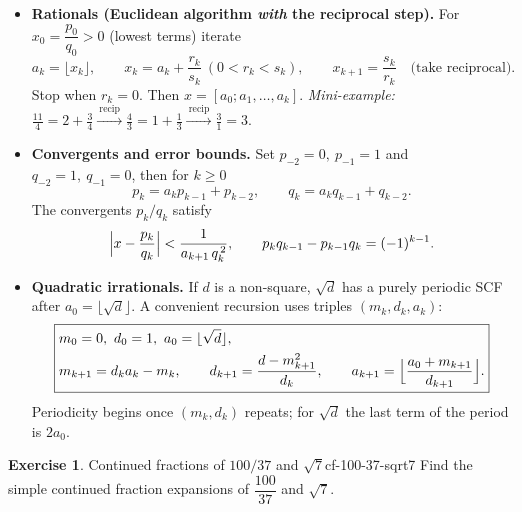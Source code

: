 \documentclass[11pt,a4paper]{article}
\theoremstyle{definition}
\newtheorem{exercise}{Exercise} %
\theoremstyle{definition}
\theoremstyle{plain}
\theoremstyle{remark}
\begin{document}
\begin{itemize}
	\item \textbf{Rationals (Euclidean algorithm \emph{with} the reciprocal step).}
	For $x_0=\dfrac{p_0}{q_0}>0$ (lowest terms) iterate
	\[
	a_k=\bigl\lfloor x_k\bigr\rfloor,\qquad
	x_k=a_k+\frac{r_k}{s_k}\ (0<r_k<s_k),\qquad
	x_{k+1}=\frac{s_k}{r_k}\quad\text{(take reciprocal).}
	\]
	Stop when $r_k=0$. Then $x=[a_0;a_1,\dots,a_k]$.
	\emph{Mini-example: }
	$\displaystyle \frac{11}{4}=2+\frac{3}{4}
	\xrightarrow{\ \text{recip}\ } \frac{4}{3}=1+\frac{1}{3}
	\xrightarrow{\ \text{recip}\ } \frac{3}{1}=3$.
	
	\item \textbf{Convergents and error bounds.}
	Set $p_{-2}=0,\ p_{-1}=1$ and $q_{-2}=1,\ q_{-1}=0$, then for $k\ge0$
	\[
	p_k=a_kp_{k-1}+p_{k-2},\qquad q_k=a_kq_{k-1}+q_{k-2}.
	\]
	The convergents $p_k/q_k$ satisfy
	\[
	\Bigl|x-\frac{p_k}{q_k}\Bigr|<\frac{1}{a_{k+1}\,q_k^{\,2}},
	\qquad
	p_k q_{k-1}-p_{k-1} q_k=(-1)^{k-1}.
	\]
	
	\item \textbf{Quadratic irrationals.}
	If $d$ is a non-square, $\sqrt d$ has a purely periodic SCF after $a_0=\lfloor\sqrt d\rfloor$.
	A convenient recursion uses triples $(m_k,d_k,a_k)$:
	\[
	\boxed{
		\begin{aligned}
			&m_0=0,\ d_0=1,\ a_0=\lfloor\sqrt d\rfloor,\\
			&m_{k+1}=d_k a_k-m_k,\qquad
			d_{k+1}=\frac{d-m_{k+1}^2}{d_k},\qquad
			a_{k+1}=\Bigl\lfloor\frac{a_0+m_{k+1}}{d_{k+1}}\Bigr\rfloor .
	\end{aligned}}
	\]
	Periodicity begins once $(m_k,d_k)$ repeats; for $\sqrt d$ the last term of the period is $2a_0$.
\end{itemize}

\begin{exercise}{Continued fractions of $100/37$ and $\sqrt7$}{cf-100-37-sqrt7}
	Find the simple continued fraction expansions of $\dfrac{100}{37}$ and $\sqrt7$.
\end{exercise}
\end{document}
